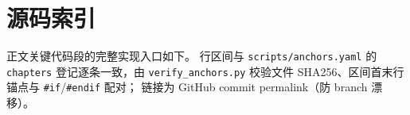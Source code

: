 \chapter{源码索引}\label{app:D}

正文关键代码段的完整实现入口如下。
行区间与 \texttt{scripts/\allowbreak{}anchors.\allowbreak{}yaml} 的
\texttt{chapters} 登记逐条一致，由 \texttt{verify\_\allowbreak{}anchors.\allowbreak{}py}
校验文件 SHA256、区间首末行锚点与 \texttt{\#if}/\texttt{\#endif} 配对；
链接为 GitHub commit permalink（防 branch 漂移）。

